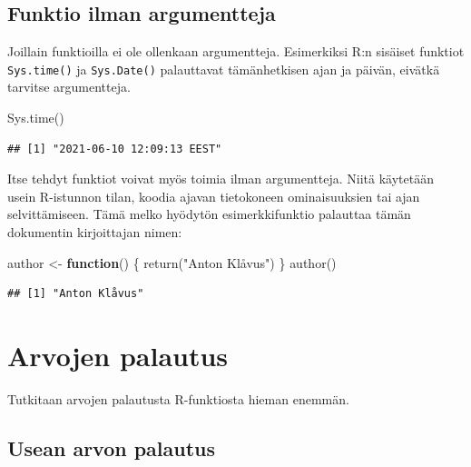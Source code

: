\documentclass[
]{book}
\newenvironment{Shaded}{\begin{snugshade}}{\end{snugshade}}
\newcommand{\ControlFlowTok}[1]{\textcolor[rgb]{0.13,0.29,0.53}{\textbf{#1}}}
\newcommand{\FunctionTok}[1]{\textcolor[rgb]{0.00,0.00,0.00}{#1}}
\newcommand{\NormalTok}[1]{#1}
\newcommand{\OtherTok}[1]{\textcolor[rgb]{0.56,0.35,0.01}{#1}}
\newcommand{\StringTok}[1]{\textcolor[rgb]{0.31,0.60,0.02}{#1}}
\begin{document}
\hypertarget{funktio-ilman-argumentteja}{%
\subsection{Funktio ilman argumentteja}\label{funktio-ilman-argumentteja}}

Joillain funktioilla ei ole ollenkaan argumentteja. Esimerkiksi R:n sisäiset funktiot \texttt{Sys.time()} ja \texttt{Sys.Date()} palauttavat tämänhetkisen ajan ja päivän, eivätkä tarvitse argumentteja.

\begin{Shaded}
\begin{Highlighting}[]
\FunctionTok{Sys.time}\NormalTok{()}
\end{Highlighting}
\end{Shaded}

\begin{verbatim}
## [1] "2021-06-10 12:09:13 EEST"
\end{verbatim}

Itse tehdyt funktiot voivat myös toimia ilman argumentteja. Niitä käytetään usein R-istunnon tilan, koodia ajavan tietokoneen ominaisuuksien tai ajan selvittämiseen. Tämä melko hyödytön esimerkkifunktio palauttaa tämän dokumentin kirjoittajan nimen:

\begin{Shaded}
\begin{Highlighting}[]
\NormalTok{author }\OtherTok{\textless{}{-}} \ControlFlowTok{function}\NormalTok{() \{}
  \FunctionTok{return}\NormalTok{(}\StringTok{"Anton Klåvus"}\NormalTok{)}
\NormalTok{\}}
\FunctionTok{author}\NormalTok{()}
\end{Highlighting}
\end{Shaded}

\begin{verbatim}
## [1] "Anton Klåvus"
\end{verbatim}

\hypertarget{arvojen-palautus}{%
\section{Arvojen palautus}\label{arvojen-palautus}}

Tutkitaan arvojen palautusta R-funktiosta hieman enemmän.

\hypertarget{usean-arvon-palautus}{%
\subsection{Usean arvon palautus}\label{usean-arvon-palautus}}
\end{document}
